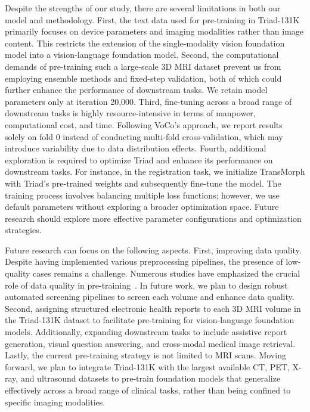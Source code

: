 Despite the strengths of our study, there are several limitations in both our model and methodology.
First, the text data used for pre-training in Triad-131K primarily focuses on device parameters and imaging modalities rather than image content. This restricts the extension of the single-modality vision foundation model into a vision-language foundation model.
Second, the computational demands of pre-training such a large-scale 3D MRI dataset prevent us from employing ensemble methods and fixed-step validation, both of which could further enhance the performance of downstream tasks.
We retain model parameters only at iteration 20,000.
Third, fine-tuning across a broad range of downstream tasks is highly resource-intensive in terms of manpower, computational cost, and time.
Following VoCo’s approach, we report results solely on fold 0 instead of conducting multi-fold cross-validation, which may introduce variability due to data distribution effects.
Fourth, additional exploration is required to optimize Triad and enhance its performance on downstream tasks.
For instance, in the registration task, we initialize TransMorph with Triad’s pre-trained weights and subsequently fine-tune the model.
The training process involves balancing multiple loss functions; however, we use default parameters without exploring a broader optimization space.
Future research should explore more effective parameter configurations and optimization strategies.


Future research can focus on the following aspects. First, improving data quality.
Despite having implemented various preprocessing pipelines, the presence of low-quality cases remains a challenge.
Numerous studies have emphasized the crucial role of data quality in pre-training~\citep{yang2024freemask,kirillov2023segment}.
In future work, we plan to design robust automated screening pipelines to screen each volume and enhance data quality.
Second, assigning structured electronic health reports to each 3D MRI volume in the Triad-131K dataset to facilitate pre-training for vision-language foundation models.
Additionally, expanding downstream tasks to include assistive report generation, visual question answering, and cross-modal medical image retrieval.
Lastly, the current pre-training strategy is not limited to MRI scans.
Moving forward, we plan to integrate Triad-131K with the largest available CT, PET, X-ray, and ultrasound datasets to pre-train foundation models that generalize effectively across a broad range of clinical tasks, rather than being confined to specific imaging modalities.

